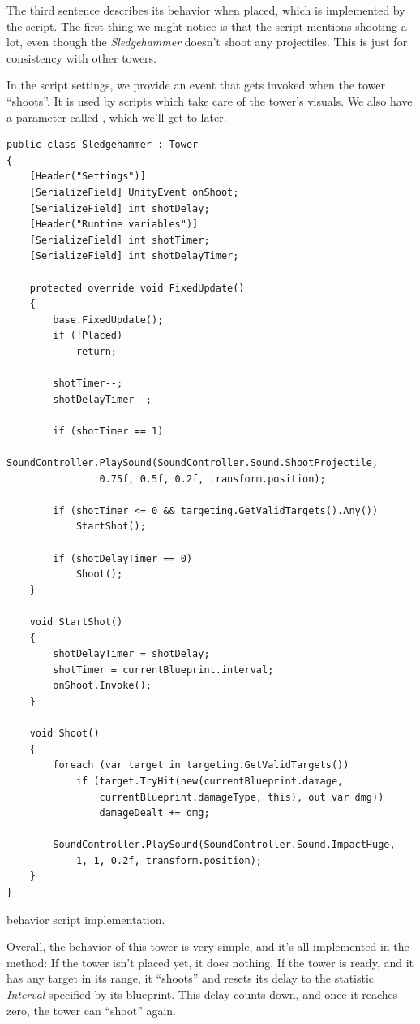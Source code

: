 The third sentence describes its behavior when placed, which is implemented by the  script.
The first thing we might notice is that the script mentions shooting a lot, even though the \emph{Sledgehammer} doesn't shoot any projectiles.
This is just for consistency with other towers.

In the script settings, we provide an event that gets invoked when the tower \enquote{shoots}.
It is used by scripts which take care of the tower's visuals.
We also have a parameter called , which we'll get to later.

\begin{listing}[H]
    \begin{verbatim}
public class Sledgehammer : Tower
{
    [Header("Settings")]
    [SerializeField] UnityEvent onShoot;
    [SerializeField] int shotDelay;
    [Header("Runtime variables")]
    [SerializeField] int shotTimer;
    [SerializeField] int shotDelayTimer;

    protected override void FixedUpdate()
    {
        base.FixedUpdate();
        if (!Placed)
            return;

        shotTimer--;
        shotDelayTimer--;

        if (shotTimer == 1)
            SoundController.PlaySound(SoundController.Sound.ShootProjectile,
                0.75f, 0.5f, 0.2f, transform.position);

        if (shotTimer <= 0 && targeting.GetValidTargets().Any())
            StartShot();

        if (shotDelayTimer == 0)
            Shoot();
    }

    void StartShot()
    {
        shotDelayTimer = shotDelay;
        shotTimer = currentBlueprint.interval;
        onShoot.Invoke();
    }

    void Shoot()
    {
        foreach (var target in targeting.GetValidTargets())
            if (target.TryHit(new(currentBlueprint.damage,
                currentBlueprint.damageType, this), out var dmg))
                damageDealt += dmg;

        SoundController.PlaySound(SoundController.Sound.ImpactHuge,
            1, 1, 0.2f, transform.position);
    }
}
    \end{verbatim}
    \caption{ behavior script implementation.}
    \label{code:sledgehammer}
\end{listing}

Overall, the behavior of this tower is very simple, and it's all implemented in the  method:
If the tower isn't placed yet, it does nothing.
If the tower is ready, and it has any target in its range, it \enquote{shoots} and resets its delay to the statistic \emph{Interval} specified by its blueprint.
This delay counts down, and once it reaches zero, the tower can \enquote{shoot} again.

